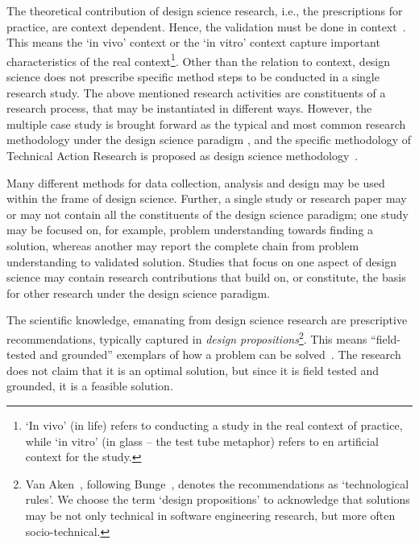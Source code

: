 \documentclass[graybox]{svmult}
\begin{document}
The theoretical contribution of design science research, i.e., the prescriptions for practice, are context dependent. Hence, the validation must be done in context~\cite{wieringa_what_2014}.  This means the  `in vivo' context or the `in vitro' context capture important characteristics of the real context\footnote{`In vivo' (in life) refers to conducting a study in the real context of practice, while `in vitro' (in glass -- the test tube metaphor) refers to en artificial context for the study.}.  Other than the relation to context, design science does not prescribe specific %
method steps to be conducted in a single research study. The above mentioned research activities are constituents of  a research process, that may be instantiated in different ways. However, the multiple case study is brought forward as the typical and most common research methodology under the design science paradigm \cite{van_aken_management_2004}, and the specific methodology of Technical Action Research is proposed as design science methodology~\cite{wieringa_technical_2012}.

Many different methods for data collection, analysis and design may be used within the frame of design science. Further, a single study or research paper may or may not contain all the constituents of the design science paradigm; one study may be focused on, for example,  problem understanding towards finding a solution, whereas another may report the complete chain from problem understanding to validated solution. Studies that focus on one aspect of design science may contain research contributions that build on, or constitute, the basis for other research under the design science paradigm.

The scientific knowledge, emanating from design science research are prescriptive recommendations, typically captured in \emph{design propositions}\footnote{Van Aken~\cite{van_aken_management_2004}, following Bunge~\cite{bunge_philosophy_1998}, denotes the recommendations as `technological rules'. We choose the term `design propositions' to acknowledge that solutions may be not only technical in software engineering research, but more often socio-technical.}. This means ``field-tested and grounded'' exemplars of how a problem can be solved~\cite{van_aken_management_2004}. The research does not claim that it is an optimal solution, but since it is field tested and grounded, it is a feasible solution.
\end{document}
